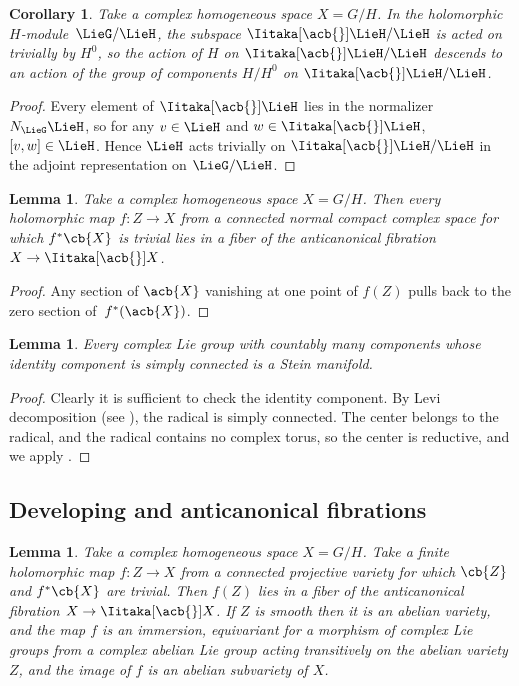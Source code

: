 \documentclass[10pt,a4paper]{amsart}
\numberwithin{equation}{section}
\newtheorem{Corollary}[Theorem]{Corollary}
\newtheorem{Lemma}[Theorem]{Lemma}
\newcommand*{\acf}[1]{\Iitaka[\acb{}]{#1}}
\begin{document}
\begin{Corollary}\label{corollary:trivial.conn}
Take a complex homogeneous space $X = G/H$.
In the holomorphic $H$-mod\-ule~$\LieG/\LieH$, the subspace $\acf\LieH/\LieH$ is acted on trivially by $H^0$, so the action
of $H$ on $\acf\LieH/\LieH$ descends to an action of the group of components $H/H^0$ on $\acf\LieH/\LieH$.
\end{Corollary}

\begin{proof}
Every element of $\acf\LieH$ lies in the normalizer $N_{\LieG} \LieH$, so for any $v \in \LieH$ and $w \in
\acf\LieH$, $[v, w] \in \LieH$.
Hence $\LieH$ acts trivially on $\acf\LieH/\LieH$ in the adjoint representation on $\LieG/\LieH$.
\end{proof}

\begin{Lemma}\label{lemma:in.the.fiber}
Take a complex homogeneous space $X = G/H$.
Then every holomorphic map $f \colon Z \to X $ from a connected normal compact complex space for
which $f^*\cb{X}$ is trivial lies in a fiber of the anticanonical fibration $X \to \acf{X}$.
\end{Lemma}

\begin{proof}
Any section of $\acb{X}$ vanishing at one point of $f(Z)$ pulls back to the zero section of~$f^*(\acb{X})$.
\end{proof}

\begin{Lemma}\label{lemma:Stein.G}
Every complex Lie group with countably many components whose identity component is simply connected is a Stein manifold.
\end{Lemma}

\begin{proof}
Clearly it is sufficient to check the identity component.
By Levi decomposition (see \cite[Theorem 16.3.7]{Hilgert.Neeb:2012}), the radical is simply connected.
The center belongs to the radical, and the radical contains no complex torus, so the center is reductive, and we apply
\cite[Theorem 1]{Matsushima/Morimoto:1960}.
\end{proof}

\subsection{Developing and anticanonical fibrations}

\begin{Lemma}\label{lemma:ab.var.in.fiber}
Take a complex homogeneous space $X = G/H$.
Take a finite holomorphic map $f \colon Z\to X$ from a connected projective variety for which $\cb{Z}$ and $f^*\cb{X}$ are trivial.
Then $f(Z)$ lies in a fiber of the anticanonical fibration $X\to \acf{X}$.
If $Z$ is smooth then it is an abelian variety, and the map $f$ is an immersion, equivariant for a morphism of complex Lie groups from a complex abelian Lie group acting transitively on the abelian variety $Z$, and the image of $f$ is an abelian subvariety of $X$.
\end{Lemma}
\end{document}
